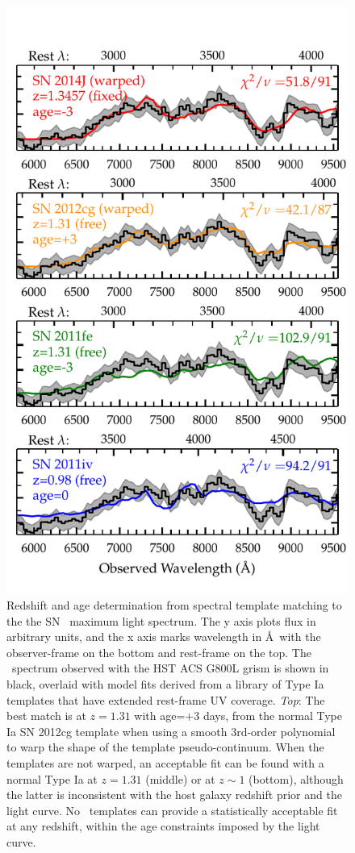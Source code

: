 \begin{figure}
\begin{center}
\includegraphics[width=\columnwidth]{FIG/specfit}
\caption{  \label{fig:SpecFit}
Redshift and age determination from spectral template matching to the
the SN \tomas\ maximum light spectrum.  The y axis plots flux in
arbitrary units, and the x axis marks wavelength in \AA\ with the
observer-frame on the bottom and rest-frame on the top.
The \tomas\ spectrum observed with the
HST ACS G800L grism is shown in black, overlaid with model fits
derived from a library of Type Ia templates that have extended
rest-frame UV coverage.  {\it Top}: The best match is at $z=1.31$ with
age=$+3$ days, from the normal Type Ia SN 2012cg template when using a
smooth 3rd-order polynomial to warp the shape of the template
pseudo-continuum.  When the templates are not warped, an acceptable
fit can be found with a normal Type Ia at $z=1.31$ (middle) or at
$z\sim1$ (bottom), although the latter is inconsistent with the host
galaxy redshift prior and the light curve. No \CCSN\ templates can
provide a statistically acceptable fit at any redshift, within the age
constraints imposed by the light curve.}
\end{center}
\end{figure}


